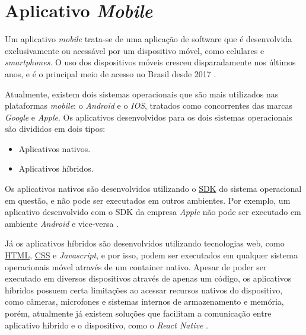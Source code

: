 \section{Aplicativo \textit{Mobile}}
Um aplicativo \textit{mobile} trata-se de uma aplicação de software que é desenvolvida exclusivamente ou acessável por um dispositivo móvel, como celulares e \textit{smartphones}. O uso dos dispositivos móveis cresceu disparadamente nos últimos anos, e é o principal meio de acesso no Brasil desde 2017 \cite{Celular}.

Atualmente, existem dois sistemas operacionais que são mais utilizados nas plataformas \textit{mobile}: o \textit{Android} e o \textit{IOS}, tratados como concorrentes das marcas \textit{Google} e \textit{Apple}. Os aplicativos desenvolvidos para os dois sistemas operacionais são divididos em dois tipos:
\begin{itemize}
\item Aplicativos nativos.
\item Aplicativos híbridos.
\end{itemize}

Os aplicativos nativos são desenvolvidos utilizando o \label{sig:SDK}\hyperlink{s:SDK}{SDK} do sistema operacional em questão, e não pode ser executados em outros ambientes. Por exemplo, um aplicativo desenvolvido com o SDK da empresa \textit{Apple} não pode ser executado em ambiente \textit{Android} e vice-versa \cite{MobileApps}.

Já os aplicativos híbridos são desenvolvidos utilizando tecnologias web, como \label{sig:HTML}\hyperlink{s:HTML}{HTML}, \label{sig:CSS}\hyperlink{s:CSS}{CSS} e \textit{Javascript}, e por isso, podem ser executados em qualquer sistema operacionais móvel através de um container nativo. Apesar de poder ser executado em diversos dispositivos através de apenas um código, os aplicativos híbridos	 possuem certa limitações ao acessar recursos nativos do dispositivo, como câmeras, microfones e sistemas internos de armazenamento e memória, porém, atualmente já existem soluções que facilitam a comunicação entre aplicativo híbrido e o dispositivo, como o \textit{React Native} \cite{MobileApps}.





